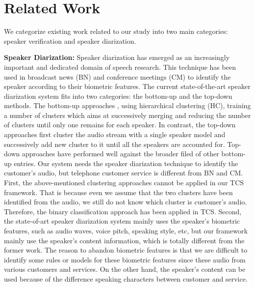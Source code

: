 \section{Related Work}
\label{sec:relatedwork}

We categorize existing work related to our study into two main categories: speaker verification and speaker diarization.

\noindent \textbf{Speaker Diarization:} Speaker diarization has emerged as an increasingly important and dedicated domain of speech research. This technique has been used in broadcast news (BN) and conference meetings (CM) to identify the speaker according to their biometric features. The current state-of-the-art speaker diarization system fits into two categories: the bottom-up and the top-down methods. The bottom-up approaches \cite{Anguera2006Robust, Nguyen2009The, Nwe2012Speaker}, using hierarchical clustering (HC), training a number of clusters which aims at successively merging and reducing the number of clusters until only one remains for each speaker. In contrast, the top-down approaches \cite{Fredouille2006Technical, Bozonnet2010The, Fredouille2009The} first cluster the audio stream with a single speaker model and successively add new cluster to it until all the speakers are accounted for. Top-down approaches have performed well against the broader filed of other bottom-up entries. Our system needs the speaker diarization technique to identify the customer's audio, but telephone customer service is different from BN and CM. First, the above-mentioned clustering approaches cannot be applied in our TCS framework. That is because even we assume that the two clusters have been identified from the audio, we still do not know which cluster is customer's audio. Therefore, the binary classification approach has been applied in TCS. Second, the state-of-art speaker diarization system mainly uses the speaker's biometric features, such as audio waves, voice pitch, speaking style, etc, but our framework mainly use the speaker's content information, which is totally different from the former work. The reason to abandon biometric features is that we are difficult to identify some rules or models for these biometric features since these audio from various customers and services. On the other hand, the speaker's content can be used because of the difference speaking characters between customer and service.

